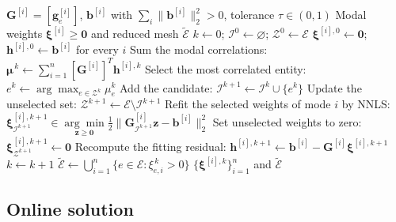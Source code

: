 \documentclass[a4paper,12pt]{article}
\newcommand{\vect}[1]{\boldsymbol{#1}}
\newcommand{\matr}[1]{\boldsymbol{#1}}
\begin{document}
\begin{algorithm}[H]
 \caption{BM-ECSW mesh sampling by modal NNLS}
 \label{alg:training}
 \small
 \begin{algorithmic}[1]
  \Require $\matr{G}^{[i]}=[\vect{g}_e^{[i]}]$, $\vect{b}^{[i]}$ with $\sum_i\|\vect{b}^{[i]}\|_2^2>0$, tolerance $\tau\in(0,1)$
  \Ensure Modal weights $\vect{\xi}^{[i]}\geq\vect{0}$ and reduced mesh $\widetilde{\mathcal E}$
  \State $k\gets0$; $\mathcal I^0\gets\varnothing$; $\mathcal Z^0\gets\mathcal E$
  \State $\vect{\xi}^{[i],0}\gets\vect{0}$; $\vect{h}^{[i],0}\gets\vect{b}^{[i]}$ for every $i$
  \While{$\sum_i\|\vect{h}^{[i],k}\|_2^2>\tau^2\sum_i\|\vect{b}^{[i]}\|_2^2$}
   \State Sum the modal correlations: $\displaystyle\vect{\mu}^{\,k}\gets\sum_{i=1}^n[\matr{G}^{[i]}]^T\vect{h}^{[i],k}$
   \State Select the most correlated entity: $e^k\gets\arg\max_{e\in\mathcal Z^k}\mu_e^k$
   \State Add the candidate: $\mathcal I^{k+1}\gets\mathcal I^k\cup\{e^k\}$
   \State Update the unselected set: $\mathcal Z^{k+1}\gets\mathcal E\setminus\mathcal I^{k+1}$
    \State Refit the selected weights of mode $i$ by NNLS:
    \Statex \hspace{\dimexpr\algorithmicindent+\algorithmicindent\relax}$\displaystyle
       \vect{\xi}^{[i],k+1}_{\mathcal I^{k+1}}\in
       \underset{\vect{z}\geq\vect{0}}{\arg\min}
       \frac12\|\matr{G}^{[i]}_{\mathcal I^{k+1}}\vect{z}-\vect{b}^{[i]}\|_2^2$
    \State Set unselected weights to zero: $\vect{\xi}^{[i],k+1}_{\mathcal Z^{k+1}}\gets\vect{0}$
    \State Recompute the fitting residual: $\vect{h}^{[i],k+1}\gets\vect{b}^{[i]}-\matr{G}^{[i]}\vect{\xi}^{[i],k+1}$
   \EndFor
   \State $k\gets k+1$
  \EndWhile
  \State $\displaystyle\widetilde{\mathcal E}\gets\bigcup_{i=1}^n\{e\in\mathcal E:\xi_{e,i}^{\,k}>0\}$
  \State \Return $\{\vect{\xi}^{[i],k}\}_{i=1}^n$ and $\widetilde{\mathcal E}$
 \end{algorithmic}
\end{algorithm}

\subsection{Online solution}
\label{sec:bm-online-equations}
\end{document}
